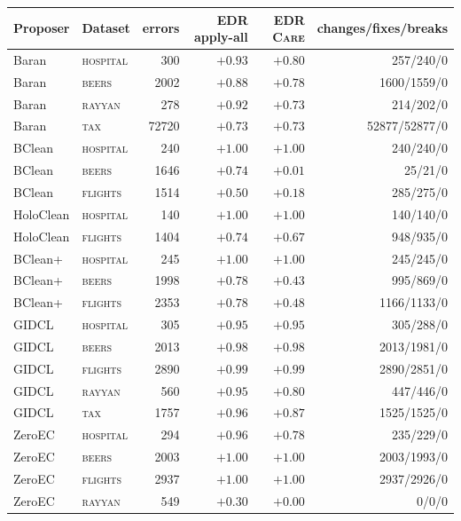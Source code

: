 \begin{tabular}{llrrrr}
\toprule
Proposer & Dataset & errors & EDR apply-all & EDR \textsc{Care} & changes/fixes/breaks \\
\midrule
Baran & \textsc{hospital} & 300 & $+0.93$ & $+0.80$ & 257/240/0 \\
Baran & \textsc{beers} & 2002 & $+0.88$ & $+0.78$ & 1600/1559/0 \\
Baran & \textsc{rayyan} & 278 & $+0.92$ & $+0.73$ & 214/202/0 \\
Baran & \textsc{tax} & 72720 & $+0.73$ & $+0.73$ & 52877/52877/0 \\
BClean & \textsc{hospital} & 240 & $+1.00$ & $+1.00$ & 240/240/0 \\
BClean & \textsc{beers} & 1646 & $+0.74$ & $+0.01$ & 25/21/0 \\
BClean & \textsc{flights} & 1514 & $+0.50$ & $+0.18$ & 285/275/0 \\
HoloClean & \textsc{hospital} & 140 & $+1.00$ & $+1.00$ & 140/140/0 \\
HoloClean & \textsc{flights} & 1404 & $+0.74$ & $+0.67$ & 948/935/0 \\
BClean+ & \textsc{hospital} & 245 & $+1.00$ & $+1.00$ & 245/245/0 \\
BClean+ & \textsc{beers} & 1998 & $+0.78$ & $+0.43$ & 995/869/0 \\
BClean+ & \textsc{flights} & 2353 & $+0.78$ & $+0.48$ & 1166/1133/0 \\
GIDCL & \textsc{hospital} & 305 & $+0.95$ & $+0.95$ & 305/288/0 \\
GIDCL & \textsc{beers} & 2013 & $+0.98$ & $+0.98$ & 2013/1981/0 \\
GIDCL & \textsc{flights} & 2890 & $+0.99$ & $+0.99$ & 2890/2851/0 \\
GIDCL & \textsc{rayyan} & 560 & $+0.95$ & $+0.80$ & 447/446/0 \\
GIDCL & \textsc{tax} & 1757 & $+0.96$ & $+0.87$ & 1525/1525/0 \\
ZeroEC & \textsc{hospital} & 294 & $+0.96$ & $+0.78$ & 235/229/0 \\
ZeroEC & \textsc{beers} & 2003 & $+1.00$ & $+1.00$ & 2003/1993/0 \\
ZeroEC & \textsc{flights} & 2937 & $+1.00$ & $+1.00$ & 2937/2926/0 \\
ZeroEC & \textsc{rayyan} & 549 & $+0.30$ & $+0.00$ & 0/0/0 \\
\bottomrule
\end{tabular}
